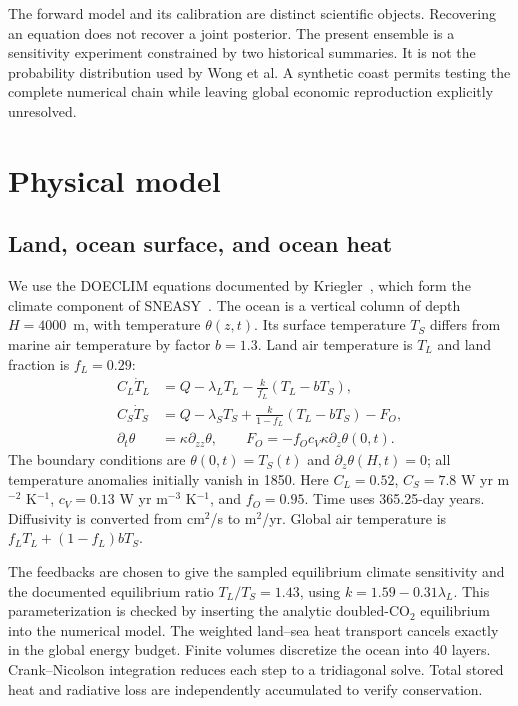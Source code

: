 \documentclass[11pt]{article}
\begin{document}
The forward model and its calibration are distinct scientific objects.
Recovering an equation does not recover a joint posterior. The present
ensemble is a sensitivity experiment constrained by two historical summaries.
It is not the probability distribution used by Wong et al. A synthetic
coast permits testing the complete numerical chain while leaving global
economic reproduction explicitly unresolved.

\section{Physical model}
\subsection{Land, ocean surface, and ocean heat}
We use the DOECLIM equations documented by Kriegler\ \cite{kriegler}, which
form the climate component of SNEASY\ \cite{urban}. The ocean is a vertical
column of depth $H=4000$~m, with temperature $\theta(z,t)$. Its surface
temperature $T_S$ differs from marine air temperature by factor $b=1.3$.
Land air temperature is $T_L$ and land fraction is $f_L=0.29$:
\begin{align}
C_L\dot T_L &= Q-\lambda_L T_L-\frac{k}{f_L}(T_L-bT_S),\\
C_S\dot T_S &= Q-\lambda_S T_S+\frac{k}{1-f_L}(T_L-bT_S)-F_O,\\
\partial_t\theta &= \kappa\partial_{zz}\theta,\qquad
F_O=-f_O c_V\kappa\partial_z\theta(0,t).
\end{align}
The boundary conditions are $\theta(0,t)=T_S(t)$ and
$\partial_z\theta(H,t)=0$; all temperature anomalies initially vanish in 1850.
Here $C_L=0.52$, $C_S=7.8$ W yr m$^{-2}$ K$^{-1}$,
$c_V=0.13$ W yr m$^{-3}$ K$^{-1}$, and $f_O=0.95$.
Time uses 365.25-day years. Diffusivity is converted from cm$^2$/s to m$^2$/yr.
Global air temperature is $f_LT_L+(1-f_L)bT_S$.

The feedbacks are chosen to give the sampled equilibrium climate sensitivity
and the documented equilibrium ratio $T_L/T_S=1.43$, using
$k=1.59-0.31\lambda_L$. This parameterization is checked by inserting the
analytic doubled-CO$_2$ equilibrium into the numerical model. The weighted
land--sea heat transport cancels exactly in the global energy budget.
Finite volumes discretize the ocean into 40 layers. Crank--Nicolson integration
reduces each step to a tridiagonal solve. Total stored heat and radiative loss
are independently accumulated to verify conservation.
\end{document}
